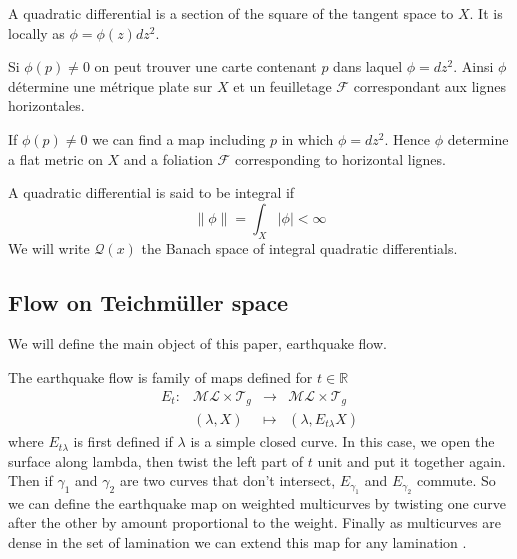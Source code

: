 \begin{dfnt}
A quadratic differential is a section of the square of the tangent space to $X$. It is locally as $\phi= \phi(z) dz^2$.
\end{dfnt}

\begin{rmq}
Si $\phi(p) \neq 0$ on peut trouver une carte contenant $p$ dans laquel $\phi = dz^2$.
Ainsi $\phi$ détermine une métrique plate sur $X$ et un feuilletage $\mathcal{F}$ correspondant aux lignes horizontales.
\end{rmq}

\begin{rmq}
If $\phi(p) \neq 0$ we can find a map including $p$ in which $\phi = dz^2$.
Hence $\phi$ determine a flat metric on $X$ and a foliation $\mathcal{F}$ corresponding to horizontal lignes.
\end{rmq}


A quadratic differential is said to be integral if\[
 \| \phi \| = \int_X | \phi | < \infty
\]
We will write $\mathcal{Q}(x)$ the Banach space of integral quadratic differentials.

\subsection{Flow on Teichmüller space}

We will define the main object of this paper, earthquake flow.

\begin{dfnt}
The earthquake flow is family of maps defined for $t \in \mathbb{R}$
\[
\begin{array}{crcl}

E_t: & \mathcal{ML}\times \mathcal{T}_g & \to & \mathcal{ML}\times \mathcal{T}_g \\

& (\lambda,X) & \mapsto & (\lambda,E_{t\lambda}X)

\end{array}
\]
where $E_{t \lambda}$ is first defined if $\lambda$ is a simple closed curve. In this case, we open the surface along lambda, then twist the left part of $t$ unit and put it together again. Then if $\gamma_1$ and $\gamma_2$ are two curves that don't intersect, $E_{\gamma_1}$ and $E_{\gamma_2}$ commute. So we can define the earthquake map on weighted multicurves by twisting one curve after the other by amount proportional to the weight. Finally as multicurves are dense in the set of lamination we can extend this map for any lamination \cite{NielsenRealizationPro}.
\end{dfnt}

